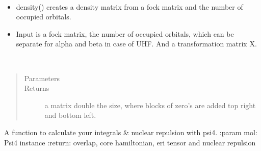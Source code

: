 \documentclass[letterpaper,10pt,english]{sphinxmanual}
\begin{document}
\begin{fulllineitems}
\label{\detokenize{SCF_functions:ghf.SCF_functions.density_matrix}}~\begin{itemize}
\item {} 
density() creates a density matrix from a fock matrix and the number of occupied orbitals.

\item {} 
Input is a fock matrix, the number of occupied orbitals, which can be separate for alpha and beta in case of UHF.
And a transformation matrix X.

\end{itemize}

\end{fulllineitems}


\begin{fulllineitems}
\label{\detokenize{SCF_functions:ghf.SCF_functions.expand_matrix}}~\begin{quote}\begin{description}
\item[{Parameters}] \leavevmode
{} \textendash{} 

\item[{Returns}] \leavevmode
a matrix double the size, where blocks of zero’s are added top right and bottom left.

\end{description}\end{quote}

\end{fulllineitems}


\begin{fulllineitems}
\label{\detokenize{SCF_functions:ghf.SCF_functions.get_integrals_psi4}}
A function to calculate your integrals \& nuclear repulsion with psi4.
:param mol: Psi4 instance
:return: overlap, core hamiltonian, eri tensor and nuclear repulsion

\end{fulllineitems}
\end{document}
